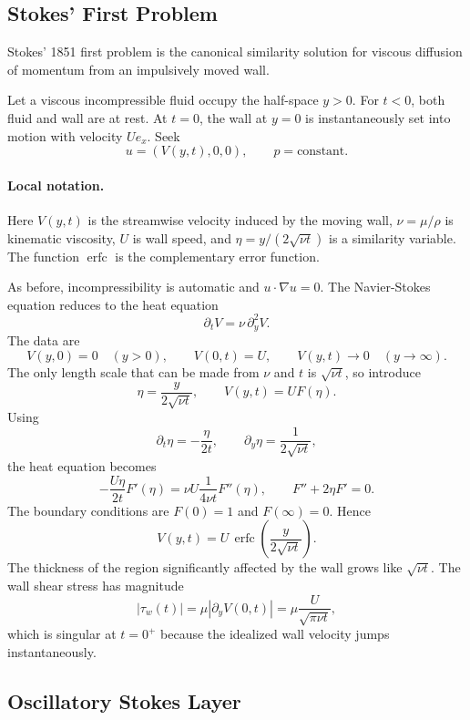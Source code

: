 \subsection{Stokes' First Problem}
\label{subsec:stokes-first-problem}

Stokes' 1851 first problem is the canonical similarity solution for viscous
diffusion of momentum from an impulsively moved wall.

Let a viscous incompressible fluid occupy the half-space \(y>0\). For
\(t<0\), both fluid and wall are at rest. At \(t=0\), the wall at \(y=0\) is
instantaneously set into motion with velocity \(Ue_x\). Seek
\[
  u=(V(y,t),0,0),
  \qquad
  p=\text{constant}.
\]

\paragraph{Local notation.}
Here \(V(y,t)\) is the streamwise velocity induced by the moving wall,
\(\nu=\mu/\rho\) is kinematic viscosity, \(U\) is wall speed, and
\(\eta=y/(2\sqrt{\nu t})\) is a similarity variable.  The function
\(\operatorname{erfc}\) is the complementary error function.

As before, incompressibility is automatic and \(u\cdot\nabla u=0\). The
Navier-Stokes equation reduces to the heat equation
\[
  \partial_t V=\nu\,\partial_y^2V.
\]
The data are
\[
  V(y,0)=0\quad(y>0),
  \qquad
  V(0,t)=U,
  \qquad
  V(y,t)\to0\quad(y\to\infty).
\]
The only length scale that can be made from \(\nu\) and \(t\) is
\(\sqrt{\nu t}\), so introduce
\[
  \eta=\frac{y}{2\sqrt{\nu t}},
  \qquad
  V(y,t)=U F(\eta).
\]
Using
\[
  \partial_t\eta=-\frac{\eta}{2t},
  \qquad
  \partial_y\eta=\frac{1}{2\sqrt{\nu t}},
\]
the heat equation becomes
\[
  -\frac{U\eta}{2t}F'(\eta)
  =
  \nu U\frac{1}{4\nu t}F''(\eta),
  \qquad
  F''+2\eta F'=0.
\]
The boundary conditions are \(F(0)=1\) and \(F(\infty)=0\). Hence
\[
  \boxed{
  V(y,t)=U\,\operatorname{erfc}\left(\frac{y}{2\sqrt{\nu t}}\right).
  }
\]
The thickness of the region significantly affected by the wall grows like
\(\sqrt{\nu t}\). The wall shear stress has magnitude
\[
  |\tau_w(t)|
  =
  \mu\left|\partial_yV(0,t)\right|
  =
  \mu\frac{U}{\sqrt{\pi\nu t}},
\]
which is singular at \(t=0^+\) because the idealized wall velocity jumps
instantaneously.

\subsection{Oscillatory Stokes Layer}
\label{subsec:oscillatory-stokes-layer}

